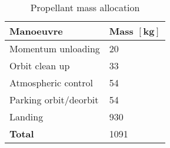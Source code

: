 \begin{table}[h]
	\centering
	\caption{Propellant mass allocation}
	\label{tab:PropMassBudget}
	\begin{tabular}{|l|l|} \hline
		\textbf {Manoeuvre}             & \textbf{Mass $\mathbf{[kg]}$ } \\ \hline \hline
		Momentum unloading       &		 20       \\ \hline
		Orbit clean up &		  33      \\ \hline
		Atmospheric control           		   &  54      \\ \hline 
		Parking orbit/deorbit            	   & 54    \\ \hline
		Landing            	   &  930     \\ \hline \hline
		\textbf {Total}                 &  1091      \\ \hline
	\end{tabular}
\end{table}
